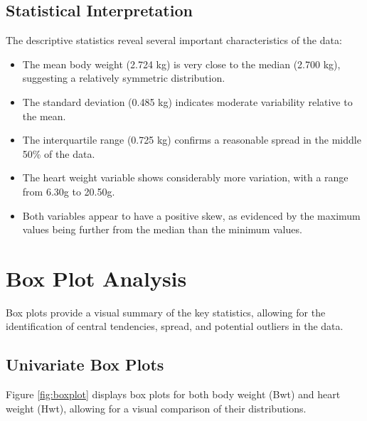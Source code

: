 \documentclass[a4paper,12pt]{article}
\begin{document}
\subsection{Statistical Interpretation}
\label{subsec:interpretation}

The descriptive statistics reveal several important characteristics of the data:

\begin{itemize}[leftmargin=1.5cm]
    \item The mean body weight (2.724 kg) is very close to the median (2.700 kg), suggesting a relatively symmetric distribution.
    \item The standard deviation (0.485 kg) indicates moderate variability relative to the mean.
    \item The interquartile range (0.725 kg) confirms a reasonable spread in the middle 50\% of the data.
    \item The heart weight variable shows considerably more variation, with a range from 6.30g to 20.50g.
    \item Both variables appear to have a positive skew, as evidenced by the maximum values being further from the median than the minimum values.
\end{itemize}

\section{Box Plot Analysis}
\label{sec:boxplots}

Box plots provide a visual summary of the key statistics, allowing for the identification of central tendencies, spread, and potential outliers in the data.

\subsection{Univariate Box Plots}
\label{subsec:univariate_bp}

Figure \ref{fig:boxplot} displays box plots for both body weight (Bwt) and heart weight (Hwt), allowing for a visual comparison of their distributions.
\end{document}
